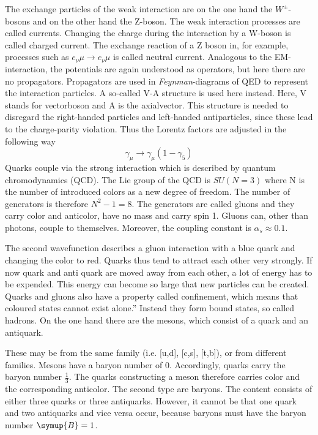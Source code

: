 The exchange particles of the weak interaction are on the one hand the $W^{\pm}$-bosons and on the other hand the Z-boson.
The weak interaction processes are called currents.
Changing the charge during the interaction by a W-boson is called charged current.
The exchange reaction of a Z boson in, for example, processes such as $e_{\nu} \mu \to e_{\nu} \mu$ is called neutral current.
Analogous to the EM-interaction, the potentials are again understood as
operators, but here there are no propagators. Propagators are
used in \textit{Feynman}-diagrams of QED to represent the interaction particles.
A so-called V-A structure is used here instead. Here, V stands for vectorboson and A is the axialvector.
This structure is needed to disregard the right-handed particles and left-handed
antiparticles, since these lead to the charge-parity violation. Thus the Lorentz factors are adjusted in the following way
\begin{equation*}
  \gamma_{\mu} \to \gamma_{\mu}(1 - \gamma_5)
\end{equation*}
Quarks couple via the strong interaction which is described by quantum chromodynamics (QCD). The Lie group of the QCD is $SU\left(N = 3\right)$ where N is the number of introduced colors as a new degree of freedom. The number of generators is therefore $N^2 - 1 = 8$.
The generators are called gluons and they carry color and anticolor, have no mass and carry spin 1.
Gluons can, other than photons, couple to themselves.
Moreover, the coupling constant is $\alpha_s \approx 0.1$.

The second wavefunction describes a gluon interaction with a blue quark and changing the color to red.
Quarks thus tend to attract each other very strongly. If now
quark and anti quark are moved away from each other, a lot of energy has to be expended. This energy can become so large that new particles can be created.
Quarks and gluons also have a property called confinement, which means that coloured states cannot exist alone.” Instead they form bound states, so called hadrons. On the one hand there are the mesons, which consist of a quark
and an antiquark.

These may be from the same family (i.e. [u,d], [c,s], [t,b]), or from
different families. Mesons have a baryon number of 0. Accordingly, quarks carry the baryon number $\frac{1}{3}$. The quarks constructing a meson therefore carries color and the corresponding anticolor.
The second type are baryons. The content consists of either three quarks or
three antiquarks. However, it cannot be that one quark and two antiquarks
and vice versa occur, because baryons must have the baryon number $\symup{B} = 1$.


